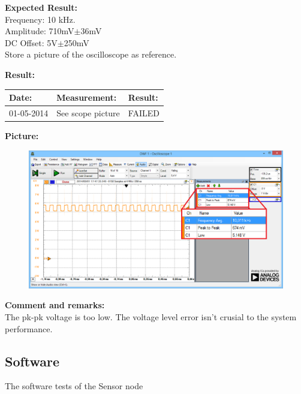 \textbf{Expected Result:}\\
Frequency: 10 kHz.\\
Amplitude: 710mV$\pm$36mV\\
DC Offset: 5V$\pm$250mV\\
Store a picture of the oscilloscope as reference.


\textbf{Result:}
\begin{table}[H]
	\centering
	\begin{tabular}{|p{2cm}|p{3cm}|p{2cm}|}\hline
		\textbf{Date:} & \textbf{Measurement:} & \textbf{Result:} \\ \hline
	 	01-05-2014 & See scope picture & FAILED \\ \hline
	\end{tabular}
\end{table}
\textbf{Picture:}
\begin{figure}[H]
\centering
\includegraphics[width=.9\textwidth]{billeder/SN_case_4_osc_picture}
\end{figure}
\textbf{Comment and remarks:}\\
The pk-pk voltage is too low. The voltage level error isn't crusial to the system performance.\\

\subsection{Software}
The software tests of the Sensor node
